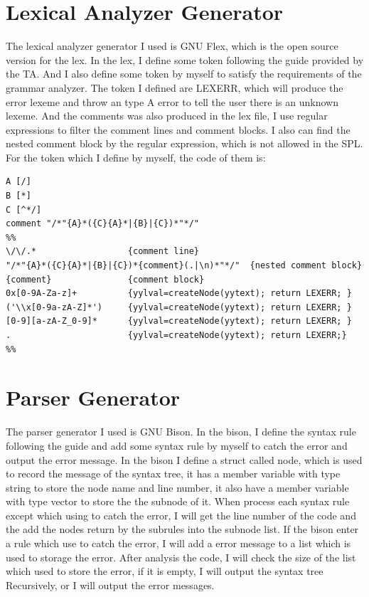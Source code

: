 \documentclass{article}
\begin{document}
    \section{Lexical Analyzer Generator}
        The lexical analyzer generator I used is GNU Flex, which is the open source version for the
        lex. In the lex, I define some token following the guide provided by the TA. And I also define some
        token by myself to satisfy the requirements of the grammar analyzer. The token I defined are 
        LEXERR, which will produce the error lexeme and throw an type A error to tell the user there is an unknown
        lexeme. And the comments was also produced in the lex file, I use regular expressions to filter the
        comment lines and comment blocks. I also can find the nested comment block by the regular expression, which is not allowed in the SPL.
        For the token which I define by myself, the code of them is:
        \begin{lstlisting}
A [/]
B [*]
C [^*/]
comment "/*"{A}*({C}{A}*|{B}|{C})*"*/"
%%
\/\/.*                  {comment line}
"/*"{A}*({C}{A}*|{B}|{C})*{comment}(.|\n)*"*/"  {nested comment block}
{comment}               {comment block}
0x[0-9A-Za-z]+          {yylval=createNode(yytext); return LEXERR; }
('\\x[0-9a-zA-Z]*')     {yylval=createNode(yytext); return LEXERR; }
[0-9][a-zA-Z_0-9]*      {yylval=createNode(yytext); return LEXERR; }
.                       {yylval=createNode(yytext); return LEXERR;}
%%
        \end{lstlisting}
    \section{Parser Generator}
        The parser generator I used is GNU Bison. In the bison, I define the syntax rule following the guide and add some syntax rule
        by myself to catch the error and output the error message. In the bison I define a struct called node, which is used to record the
        message of the syntax tree, it has a member variable with type string to store the node name and line number, it also have a member
        variable with type vector to store the the subnode of it. When process each syntax rule except which using to catch the error, 
        I will get the line number of the code and the add the nodes return by the subrules into the subnode list. If the bison enter a rule which
        use to catch the error, I will add a error message to a list which is used to storage the error. After analysis the code, I will check the size of the
        list which used to store the error, if it is empty, I will output the syntax tree Recursively, or I will output the error messages.
\end{document}
